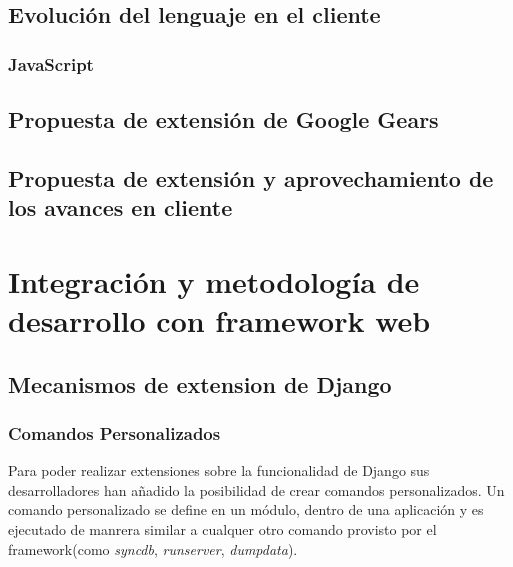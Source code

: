 \documentclass[a4paper]{report}
\begin{document}
\section{Evolución del lenguaje en el cliente}
\subsection{JavaScript}

\section{Propuesta de extensión de Google Gears}
\section{Propuesta de extensión y aprovechamiento de los avances en cliente}





\chapter{Integración y metodología de desarrollo con framework web}
\section{Mecanismos de extension de Django}

\subsection{Comandos Personalizados}



Para poder realizar extensiones sobre la funcionalidad de Django sus
desarrolladores han añadido la posibilidad de crear comandos
personalizados. Un comando personalizado se define en un módulo, dentro
de una aplicación y es ejecutado de manrera similar a cualquer 
otro comando provisto por el framework(como 
\emph{syncdb}, \emph{runserver}, \emph{dumpdata}).
\end{document}
